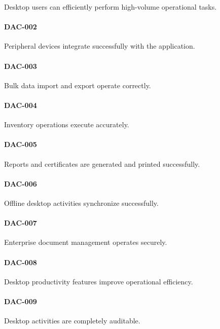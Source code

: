 Desktop users can efficiently perform high-volume operational tasks.

\paragraph{DAC-002}

Peripheral devices integrate successfully with the application.

\paragraph{DAC-003}

Bulk data import and export operate correctly.

\paragraph{DAC-004}

Inventory operations execute accurately.

\paragraph{DAC-005}

Reports and certificates are generated and printed successfully.

\paragraph{DAC-006}

Offline desktop activities synchronize successfully.

\paragraph{DAC-007}

Enterprise document management operates securely.

\paragraph{DAC-008}

Desktop productivity features improve operational efficiency.

\paragraph{DAC-009}

Desktop activities are completely auditable.


